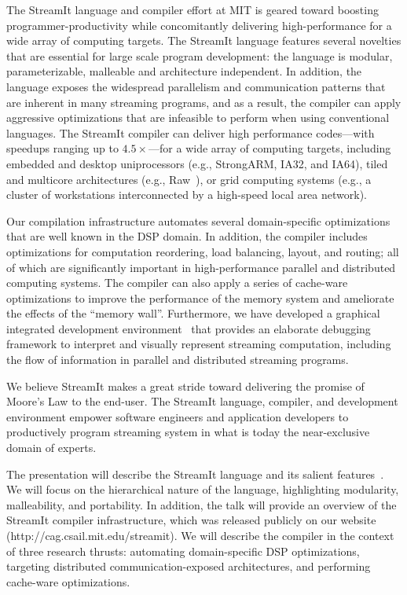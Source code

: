 \documentclass[times,10pt]{tr}
\begin{document}
The StreamIt language and compiler effort at MIT is geared toward
boosting programmer-productivity while concomitantly delivering
high-performance for a wide array of computing targets. The StreamIt
language features several novelties that  are essential for large
scale program development: the language is modular, parameterizable,
malleable and architecture independent. In addition, the language exposes the
widespread parallelism and communication patterns that are inherent in
many streaming programs, and as a result, the compiler can apply
aggressive optimizations that are infeasible to perform when using
conventional languages. The StreamIt compiler can deliver high
performance codes---with speedups ranging up to $4.5\times$---for a
wide array of computing targets, including embedded and desktop
uniprocessors (e.g., StrongARM, IA32, and IA64),  tiled and multicore
architectures (e.g., Raw~\cite{raw}), or grid computing 
systems (e.g., a cluster of workstations interconnected by a
high-speed local area network).

Our compilation infrastructure automates several domain-specific
optimizations that are well known in the DSP domain. In addition, the
compiler includes optimizations  for computation reordering, load
balancing, layout, and routing; all of which are significantly
important in high-performance parallel and distributed computing
systems. The compiler can also apply a series of cache-ware
optimizations to improve the performance of the memory system and
ameliorate the effects of the ``memory wall''. Furthermore, we have
developed a graphical integrated development environment~\cite{kkuo-pphec} that
provides an elaborate debugging framework to interpret and visually
represent streaming computation, including the flow of information in
parallel and distributed streaming programs.

We believe StreamIt makes a great stride toward  delivering the
promise of Moore's Law to the end-user. The StreamIt language,
compiler, and development environment empower software engineers and
application developers to productively program streaming system in
what is today  the near-exclusive domain of experts.

\vspace{+20pt}
 The   presentation   will
describe   the  StreamIt language and its salient
features~\cite{streamitcc,thies-ppopp-2005}. We will focus on the
hierarchical nature of the language, highlighting modularity,
malleability, and portability. In addition, the talk will provide an
overview of the StreamIt compiler infrastructure, which was released
publicly on our website (http://cag.csail.mit.edu/streamit).  We will
describe the compiler in the context of three research thrusts:
automating domain-specific DSP optimizations,  targeting distributed
communication-exposed architectures, and performing cache-ware
optimizations.
\end{document}
